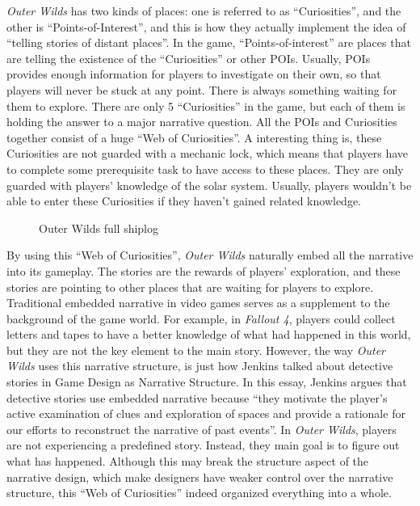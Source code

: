 \documentclass[doc, biblatex]{apa6}
\begin{document}
\textit{Outer Wilds} has two kinds of places: one is referred to as
``Curiosities'', and the other is ``Points-of-Interest'', and this is how they
actually implement the idea of ``telling stories of distant places''. In the
game, ``Points-of-interest'' are places that are telling the existence of the
``Curiosities'' or other POIs. Usually, POIs provides enough information for
players to investigate on their own, so that players will never be stuck at any
point. There is always something waiting for them to explore. There are only 5
``Curiosities'' in the game, but each of them is holding the answer to a major
narrative question. All the POIs and Curiosities together consist of a huge
``Web of Curiosities''. A interesting thing is, these Curiosities are not
guarded with a mechanic lock, which means that players have to complete some
prerequisite task to have access to these places. They are only guarded with
players' knowledge of the solar system. Usually, players wouldn't be able to
enter these Curiosities if they haven't gained related knowledge.

\begin{figure*}
  \centering
  \caption{Outer Wilds full shiplog}
\end{figure*}

By using this ``Web of Curiosities'', \textit{Outer Wilds} naturally embed all
the narrative into its gameplay. The stories are the rewards of players'
exploration, and these stories are pointing to other places that are waiting for
players to explore. Traditional embedded narrative in video games serves as a
supplement to the background of the game world. For example, in \textit{Fallout
  4}, players could collect letters and tapes to have a better knowledge of what
had happened in this world, but they are not the key element to the main
story. However, the way \textit{Outer Wilds} uses this narrative structure, is
just how Jenkins talked about detective stories in Game Design as Narrative
Structure. In this essay, Jenkins argues that detective stories use embedded
narrative because ``they motivate the player's active examination of clues and
exploration of spaces and provide a rationale for our efforts to reconstruct the
narrative of past events''\parencite{jenkins2004game}. In \textit{Outer Wilds},
players are not experiencing a predefined story. Instead, they main goal is to
figure out what has happened. Although this may break the structure aspect of
the narrative design, which make designers have weaker control over the
narrative structure, this ``Web of Curiosities'' indeed organized everything
into a whole.
\end{document}

